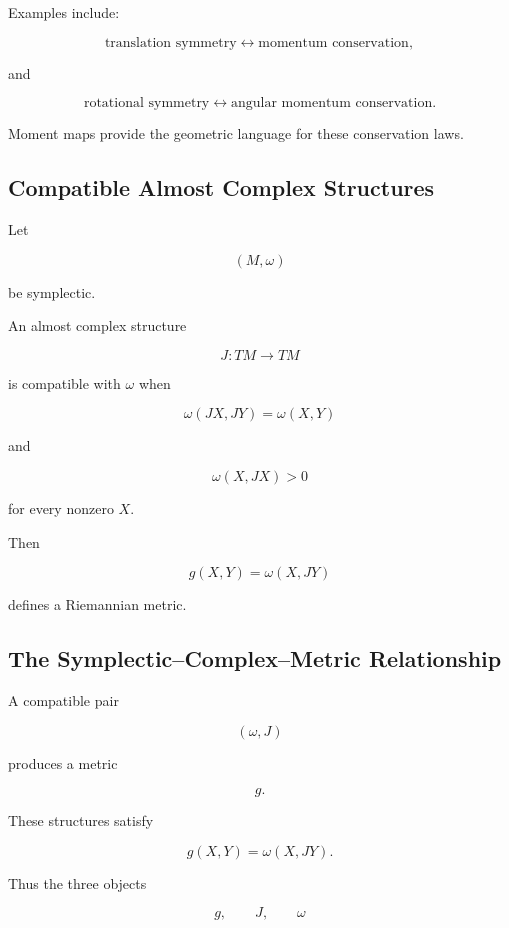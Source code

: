 Examples include:

\[
\boxed{
\text{translation symmetry}
\longleftrightarrow
\text{momentum conservation},
}
\]

and

\[
\boxed{
\text{rotational symmetry}
\longleftrightarrow
\text{angular momentum conservation}.
}
\]

Moment maps provide the geometric language for these conservation laws.

\subsection{Compatible Almost Complex Structures}
\label{subsec:symplectic-compatible-complex}

Let

\[
(M,\omega)
\]

be symplectic.

An almost complex structure

\[
J:TM\to TM
\]

is compatible with \(\omega\) when

\[
\boxed{
\omega(JX,JY)=\omega(X,Y)
}
\]

and

\[
\boxed{
\omega(X,JX)>0
}
\]

for every nonzero \(X\).

Then

\[
\boxed{
g(X,Y)=\omega(X,JY)
}
\]

defines a Riemannian metric.

\subsection{The Symplectic--Complex--Metric Relationship}
\label{subsec:symplectic-complex-metric}

A compatible pair

\[
(\omega,J)
\]

produces a metric

\[
g.
\]

These structures satisfy

\[
\boxed{
g(X,Y)=\omega(X,JY).
}
\]

Thus the three objects

\[
\boxed{
g,\qquad J,\qquad\omega
}
\]

